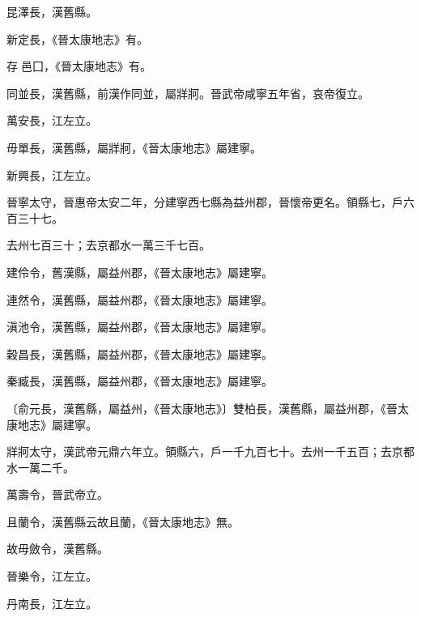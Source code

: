 \begin{pinyinscope}
 昆澤長，漢舊縣。



 新定長，《晉太康地志》有。



 存邑囗，《晉太康地志》有。



 同並長，漢舊縣，前漢作同並，屬牂牁。晉武帝咸寧五年省，哀帝復立。



 萬安長，江左立。



 毋單長，漢舊縣，屬牂牁，《晉太康地志》屬建寧。



 新興長，江左立。



 晉寧太守，晉惠帝太安二年，分建寧西七縣為益州郡，晉懷帝更名。領縣七，戶六百三十七。



 去州七百三十；去京都水一萬三千七百。



 建伶令，舊漢縣，屬益州郡，《晉太康地志》屬建寧。



 連然令，漢舊縣，屬益州郡，《晉太康地志》屬建寧。



 滇池令，漢舊縣，屬益州郡，《晉太康地志》屬建寧。



 穀昌長，漢舊縣，屬益州郡，《晉太康地志》屬建寧。


秦臧長，漢舊縣，屬益州郡，《晉太康地志》屬建寧。



 〔俞元長，漢舊縣，屬益州，《晉太康地志》〕雙柏長，漢舊縣，屬益州郡，《晉太康地志》屬建寧。



 牂牁太守，漢武帝元鼎六年立。領縣六，戶一千九百七十。去州一千五百；去京都水一萬二千。



 萬壽令，晉武帝立。



 且蘭令，漢舊縣云故且蘭，《晉太康地志》無。



 故毋斂令，漢舊縣。



 晉樂令，江左立。



 丹南長，江左立。




\end{pinyinscope}
